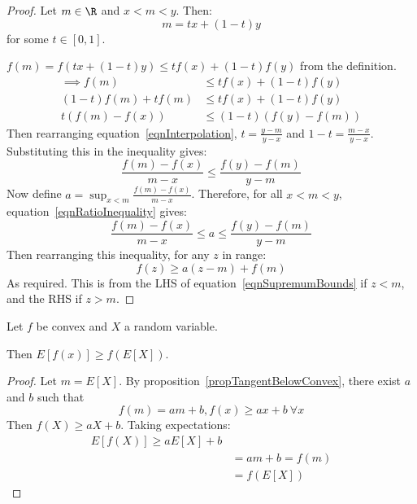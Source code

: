 \documentclass[../Main.tex]{subfiles}
\begin{document}
\begin{proof}
    Let $m \in \R$ and $x < m < y$. Then:
    \begin{equation}
        m = tx + (1-t)y
        \label{eqnInterpolation}
    \end{equation}
    for some $t \in [0, 1]$.\par
    $f(m) = f(tx + (1-t)y) \leq tf(x) + (1-t)f(y)$ from the definition.
    \begin{align*}
        \implies f(m) &\leq  tf(x) + (1-t)f(y) \\
        (1 - t) f(m) + tf(m) &\leq tf(x) + (1-t)f(y) \\
        t(f(m) - f(x)) &\leq (1-t)(f(y)-f(m))
    \end{align*}
    Then rearranging equation~\ref{eqnInterpolation}, $t = \frac{y - m}{y - x}$ and $1 - t = \frac{m - x}{y - x}$. Substituting this in the inequality gives:
    \begin{equation}
        \frac{f(m) - f(x)}{m - x} \leq \frac{f(y) - f(m)}{y-m}
        \label{eqnRatioInequality}
    \end{equation}
    Now define $a = \sup_{x < m} \frac{f(m) - f(x)}{m - x}$. Therefore, for all $x < m < y$, equation~\ref{eqnRatioInequality} gives:
    \begin{equation}
        \frac{f(m) - f(x)}{m - x} \leq a \leq \frac{f(y) - f(m)}{y - m}
        \label{eqnSupremumBounds}
    \end{equation}
    Then rearranging this inequality, for any $z$ in range:
    \begin{equation*}
        f(z) \geq a(z - m) + f(m)
    \end{equation*}
    As required. This is from the LHS of equation~\ref{eqnSupremumBounds} if $z < m$, and the RHS if $z > m$.
\end{proof}
\begin{theorem}
    Let $f$ be convex and $X$ a random variable.\par
    Then $E[f(x)] \geq f(E[X])$.
    \label{thmJensenInequality}
\end{theorem}
\begin{proof}
    Let $m = E[X]$. By proposition~\ref{propTangentBelowConvex}, there exist $a$ and $b$ such that
    \begin{equation*}
        f(m) = am + b, f(x) \geq ax + b~\forall x
    \end{equation*}
    Then $f(X) \geq aX + b$. Taking expectations:
    \begin{align*}
        E[f(X)] \geq aE[X] + b \\
        &= am + b = f(m) \\
        &= f(E[X])
    \end{align*}
\end{proof}
\end{document}
